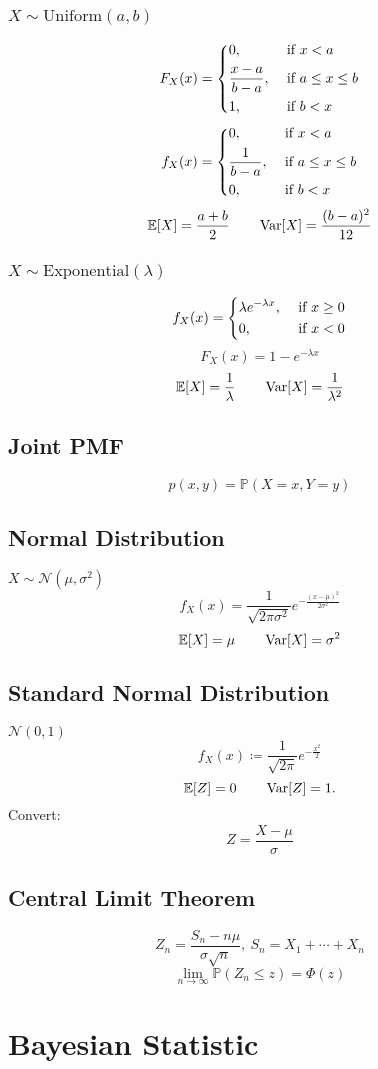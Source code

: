 \documentclass[10pt,landscape,a4paper]{article}
\begin{document}
\begin{multicols}{4}
\subsubsection*{\(X \sim \text{Uniform}(a, b)\)}
\[
    F_X(x) = \begin{dcases}
        0, &\text{ if } x < a \\
        \frac{x - a}{b - a}, &\text{ if } a \leq x \leq b \\
        1 , &\text{ if } b < x
    \end{dcases}
\]
\[
  f_X(x) = \begin{dcases}
    0, &\text{ if } x < a \\
    \frac{1}{b - a}, &\text{ if } a \leq x \leq b \\
    0 , &\text{ if } b < x
  \end{dcases}
\]
\[
  \mathbb{E}[X] = \dfrac{a + b}{2} \quad\quad \operatorname{Var}[X] = \dfrac{(b - a)^2}{12}
\]

\subsubsection*{\(X \sim \text{Exponential}(\lambda)\)}
\[
  f_X(x) = \begin{dcases}
    \lambda e^{-\lambda x} , &\text{ if }  x \geq 0\\
    0 , &\text{ if } x < 0
  \end{dcases}
\]
\[
    F_X(x) = 1 - e^{- \lambda x}
\]
\[
  \mathbb{E}[X] = \dfrac{1}{\lambda} \quad\quad \operatorname{Var}[X] = \dfrac{1}{\lambda^2}
\]

\subsection*{Joint PMF}
\[
    p(x, y) = \mathbb{P}(X = x, Y = y)
\]

\subsection*{Normal Distribution}
\(X \sim \mathcal{N}(\mu, \sigma^2)\) 
\[
  f_X(x) = \dfrac{1}{\sqrt{2\pi \sigma ^2}}e^{-\frac{(x - \mu)^2}{2\sigma^2}}
\]
\[
    \mathbb{E}[X] = \mu \quad\quad \operatorname{Var}[X] = \sigma^2
\]

\subsection*{Standard Normal Distribution}
\(\mathcal{N}(0, 1)\) 
\[
  f_X(x) \coloneqq \dfrac{1}{\sqrt{2\pi}} e^{-\frac{x^2}{2}}
\]
\[
  \mathbb{E}[Z] = 0 \quad\quad \operatorname{Var}[Z] = 1.
\]
Convert: 
\[
  Z = \frac{X - \mu}{\sigma}
\]

\subsection*{Central Limit Theorem}
\[
  Z_n = \dfrac{S_n - n\mu}{\sigma\sqrt{n}},\  S_n = X_1 + \cdots + X_n
\]
\[
  \lim_{n \to \infty} \mathbb{P}(Z_n \leq z) = \varPhi (z)
\]

\section*{Bayesian Statistic}
\vfill\break
\end{multicols}
\end{document}

